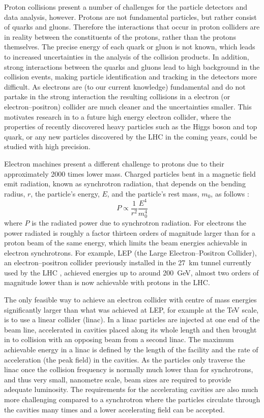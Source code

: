 Proton collisions present a number of challenges for the particle detectors and data analysis, however. Protons are not fundamental particles, but rather consist of quarks and gluons. Therefore the interactions that occur in proton colliders are in reality between the constituents of the protons, rather than the protons themselves. The precise energy of each quark or gluon is not known, which leads to increased uncertainties in the analysis of the collision products. In addition, strong interactions between the quarks and gluons lead to high background in the collision events, making particle identification and tracking in the detectors more difficult. As electrons are (to our current knowledge) fundamental and do not partake in the strong interaction the resulting collisions in a electron (or electron--positron) collider are much cleaner and the uncertainties smaller. This motivates research in to a future high energy electron collider, where the properties of recently discovered heavy particles such as the Higgs boson and top quark, or any new particles discovered by the LHC in the coming years, could be studied with high precision. 

Electron machines present a different challenge to protons due to their approximately 2000 times lower mass. Charged particles bent in a magnetic field emit radiation, known as synchrotron radiation, that depends on the bending radius, \(r\), the particle's energy, \(E\), and the particle's rest mass, \(m_0\), as follows \cite{wilson}:
\begin{equation}
P \propto \frac{1}{r^2} \frac{E^4}{m_0^4}
\end{equation}
where \(P\) is the radiated power due to synchrotron radiation. For electrons the power radiated is roughly a factor thirteen orders of magnitude larger than for a proton beam of the same energy, which limits the beam energies achievable in electron synchrotrons. For example, LEP (the Large Electron--Positron Collider), an electron--positron collider previously installed in the 27~km tunnel currently used by the LHC \cite{LEP}, achieved energies up to around 200~GeV, almost two orders of magnitude lower than is now achievable with protons in the LHC.

The only feasible way to achieve an electron collider with centre of mass energies significantly larger than what was achieved at LEP, for example at the TeV scale, is to use a linear collider (linac). In a linac particles are injected at one end of the beam line, accelerated in cavities placed along its whole length and then brought in to collision with an opposing beam from a second linac. The maximum achievable energy in a linac is defined by the length of the facility and the rate of acceleration (the peak field) in the cavities. As the particles only traverse the linac once the collision frequency is normally much lower than for synchrotrons, and thus very small, nanometre scale, beam sizes are required to provide adequate luminosity. The requirements for the accelerating cavities are also much more challenging compared to a synchrotron where the particles circulate through the cavities many times and a lower accelerating field can be accepted.

